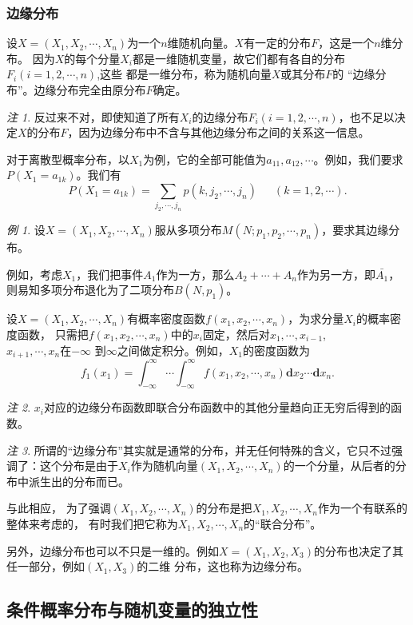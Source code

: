 \documentclass[a4paper,11pt]{article}%
\theoremstyle{remark}
\newtheorem*{remark}{注}
\theoremstyle{remark}
\newtheorem*{example}{例}
\theoremstyle{definition}
\theoremstyle{definition}
\theoremstyle{plain}
\begin{document}
\subsubsection{边缘分布}
设$X=(X_1,X_2,\cdots,X_n)$为一个$n$维随机向量。$X$有一定的分布$F$，这是一个$n$维分布。
因为$X$的每个分量$X_i$都是一维随机变量，故它们都有各自的分布$F_i(i=1,2,\cdots,n)$,这些
都是一维分布，称为随机向量$X$或其分布$F$的 ``边缘分布''。边缘分布完全由原分布$F$确定。
\begin{remark}
    反过来不对，即使知道了所有$X_i$的边缘分布$F_i(i=1,2,\cdots,n)$，也不足以决定$X$的分布$F$，因为边缘分布中不含与其他边缘分布之间的关系这一信息。
\end{remark}
对于离散型概率分布，以$X_1$为例，它的全部可能值为$a_{11},a_{12},\cdots$。例如，我们要求$P(X_1=a_{1k})$。我们有
\[P(X_1=a_{1k})=\sum_{j_2,\cdots,j_n}p(k,j_2,\cdots,j_n)\phantom{111}(k=1,2,\cdots).\]
\begin{example}
    设$X=(X_1,X_2,\cdots,X_n)$服从多项分布$M(N;p_1,p_2,\cdots,p_n)$，要求其边缘分布。

    例如，考虑$X_1$，我们把事件$A_1$作为一方，那么$A_2+\cdots+A_n$作为另一方，即$\bar{A_1}$，则易知多项分布退化为了二项分布$B(N,p_1)$。
\end{example}
设$X=(X_1,X_2,\cdots,X_n)$有概率密度函数$f(x_1,x_2,\cdots,x_n)$，为求分量$X_i$的概率密度函数，
只需把$f(x_1,x_2,\cdots,x_n)$中的$x_i$固定，然后对$x_1,\cdots,x_{i-1}$,\\$x_{i+1},\cdots,x_n$在$-\infty$
到$\infty$之间做定积分。例如，$X_1$的密度函数为
\[f_1(x_1)=\int^{\infty}_{-\infty}\cdots\int^{\infty}_{-\infty}f(x_1,x_2,\cdots,x_n)\mathbf{d}x_2\cdots\mathbf{d}x_n.\]
\begin{remark}$x_i$对应的边缘分布函数即联合分布函数中的其他分量趋向正无穷后得到的函数。
\end{remark}
\begin{remark}
    所谓的``边缘分布''其实就是通常的分布，并无任何特殊的含义，它只不过强调了：这个分布是由于$X_i$作为随机向量$(X_1,X_2,\cdots,X_n)$的一个分量，从后者的分布中派生出的分布而已。

    与此相应， 为了强调$(X_1,X_2,\cdots,X_n)$的分布是把$X_1,X_2,\cdots,X_n$作为一个有联系的整体来考虑的，
    有时我们把它称为$X_1,X_2,\cdots,X_n$的``联合分布''。

    另外，边缘分布也可以不只是一维的。例如$X=(X_1,X_2,X_3)$的分布也决定了其任一部分，例如$(X_1,X_3)$的二维
    分布，这也称为边缘分布。
\end{remark}
\subsection{条件概率分布与随机变量的独立性}
\end{document}
